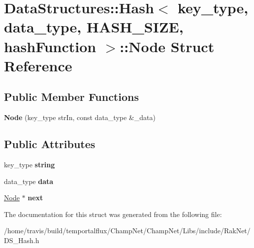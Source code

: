 \hypertarget{struct_data_structures_1_1_hash_1_1_node}{\section{Data\-Structures\-:\-:Hash$<$ key\-\_\-type, data\-\_\-type, H\-A\-S\-H\-\_\-\-S\-I\-Z\-E, hash\-Function $>$\-:\-:Node Struct Reference}
\label{struct_data_structures_1_1_hash_1_1_node}
}
\subsection*{Public Member Functions}
\begin{DoxyCompactItemize}
\item 
\hypertarget{struct_data_structures_1_1_hash_1_1_node_a2c15fd204074a581b874b8fcb408173a}{{\bfseries Node} (key\-\_\-type str\-In, const data\-\_\-type \&\-\_\-data)}\label{struct_data_structures_1_1_hash_1_1_node_a2c15fd204074a581b874b8fcb408173a}

\end{DoxyCompactItemize}
\subsection*{Public Attributes}
\begin{DoxyCompactItemize}
\item 
\hypertarget{struct_data_structures_1_1_hash_1_1_node_a78a8054e8eb1a6de9e6a7b353db7d539}{key\-\_\-type {\bfseries string}}\label{struct_data_structures_1_1_hash_1_1_node_a78a8054e8eb1a6de9e6a7b353db7d539}

\item 
\hypertarget{struct_data_structures_1_1_hash_1_1_node_ac6cbab07d9ddeaa360c696441c7610fa}{data\-\_\-type {\bfseries data}}\label{struct_data_structures_1_1_hash_1_1_node_ac6cbab07d9ddeaa360c696441c7610fa}

\item 
\hypertarget{struct_data_structures_1_1_hash_1_1_node_aa11169ce1f1405573a03c05d7a32658b}{\hyperlink{struct_data_structures_1_1_hash_1_1_node}{Node} $\ast$ {\bfseries next}}\label{struct_data_structures_1_1_hash_1_1_node_aa11169ce1f1405573a03c05d7a32658b}

\end{DoxyCompactItemize}


The documentation for this struct was generated from the following file\-:\begin{DoxyCompactItemize}
\item 
/home/travis/build/temportalflux/\-Champ\-Net/\-Champ\-Net/\-Libs/include/\-Rak\-Net/D\-S\-\_\-\-Hash.\-h\end{DoxyCompactItemize}
